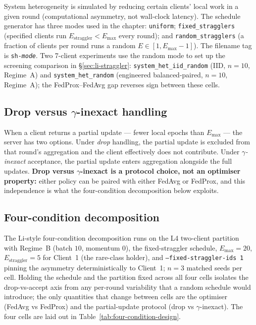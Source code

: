 \documentclass[11pt,a4paper]{report}
\begin{document}
System heterogeneity is simulated by reducing certain clients' local
work in a given round (computational asymmetry, not wall-clock
latency). The schedule generator has three
modes used in the chapter: \texttt{uniform}; \texttt{fixed\_stragglers}
(specified clients run $E_{\textrm{straggler}} < E_{\max}$ every
round); and \texttt{random\_stragglers} (a fraction of clients per
round runs a random $E \in [1, E_{\max}-1]$). The filename tag is
\texttt{sh-\textit{mode}}. Two 7-client experiments use the random
mode to set up the screening comparison in §\ref{sec:li-straggler}:
\texttt{system\_het\_iid\_random} (IID, $n = 10$, Regime~A) and
\texttt{system\_het\_random} (engineered balanced-paired, $n = 10$,
Regime~A); the FedProx--FedAvg gap reverses sign between these cells.

\subsection{Drop versus $\gamma$-inexact handling}

When a client returns a partial update --- fewer local epochs than
$E_{\max}$ --- the server has two options. Under \emph{drop} handling,
the partial update is excluded from that round's aggregation and the
client effectively does not contribute. Under \emph{$\gamma$-inexact}
acceptance, the partial update enters aggregation alongside the full
updates. \textbf{Drop versus $\gamma$-inexact is a protocol choice, not
an optimiser property:} either policy can be paired with either FedAvg
or FedProx, and this independence is what the four-condition
decomposition below exploits.

\subsection{Four-condition decomposition}

The Li-style four-condition decomposition runs on the L4 two-client
partition with Regime~B (batch $10$, momentum $0$), the fixed-straggler
schedule, $E_{\max} = 20$, $E_{\textrm{straggler}} = 5$ for Client~1
(the rare-class holder), and \texttt{--fixed-straggler-ids 1} pinning
the asymmetry deterministically to Client~1; $n = 3$ matched seeds per
cell. Holding the schedule and the partition fixed across all four
cells isolates the drop-vs-accept axis from any per-round variability
that a random schedule would introduce; the only quantities that change
between cells are the optimiser (FedAvg vs FedProx) and the
partial-update protocol (drop vs $\gamma$-inexact). The four cells are
laid out in Table~\ref{tab:four-condition-design}.
\end{document}

